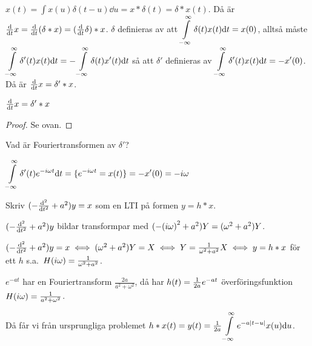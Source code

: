 \documentclass[a4paper]{article}
\begin{document}
\(
    x(t) = \int x(u) \delta(t - u) \dd u = x * \delta(t) = \delta * x(t)
\). Då är \(
    \dv{t} x = \dv{t}(\delta * x) = (\dv{t} \delta) * x
\). \(
    \delta
\) definieras av att \(
        \displaystyle\int\limits_{-\infty}^{\infty} \delta(t) x(t) \dd t = x(0)
\), alltså måste \(
    \displaystyle\int\limits_{-\infty}^{\infty} \delta'(t)x(t) \dd t = - \displaystyle\int\limits_{-\infty}^{\infty} \delta(t) x'(t) \dd t
\) så att \(
    \delta'
\) definieras av \(
    \displaystyle\int\limits_{-\infty}^{\infty} \delta'(t) x(t) \dd t = - x'(0)
\). Då är \(
    \dv{t} x = \delta' * x
\).

\begin{sats}
    \(
        \dv{t} x = \delta' * x
    \) 

    \begin{proof}
        Se ovan.
    \end{proof}
\end{sats}

\begin{ex}
    Vad är Fouriertransformen av \(
        \delta'
    \)?

    \(
        \displaystyle\int\limits_{-\infty}^{\infty} \delta'(t) e^{-i\omega t} \dd t 
        = \{ e^{-i\omega t} = x(t) \} 
        = -x'(0) 
        = -i\omega
    \) 
\end{ex}

\begin{ex}
    Skriv \(
        (-\dv[2]{t} + a^2)y = x
    \) som en LTI på formen \(
        y = h*x
    \).

    \(
        (-\dv[2]{t} + a^2)y 
    \) bildar transformpar med \(
        (-{(i\omega)}^2+a^2)Y = (\omega^2 + a^2)Y
    \).

    \(
        (-\dv[2]{t} + a^2)y = x \iff (\omega^2 + a^2)Y = X
        \iff Y = \frac{1}{\omega^2+a^2}X
        \iff y = h * x
    \) för ett \(
        h
    \) s.a.\ \(
        H(i\omega) = \frac{1}{\omega^2+a^2}
    \).

    \(
       e^{-at} 
    \) har en Fouriertransform \(
        \frac{2a}{a^2+\omega^2}
    \), då har \(
        h(t) = \frac{1}{2a} e^{-at}
    \) överföringsfunktion \(
        H(i\omega) = \frac{1}{a^2+\omega^2}
    \). 

    Då får vi från ursprungliga problemet \(
        h * x(t) = y(t) = \frac{1}{2a} \displaystyle\int\limits_{-\infty}^{\infty} e^{-a\abs{t-u}}x(u)\dd u
    \).
\end{ex}

\end{document}
